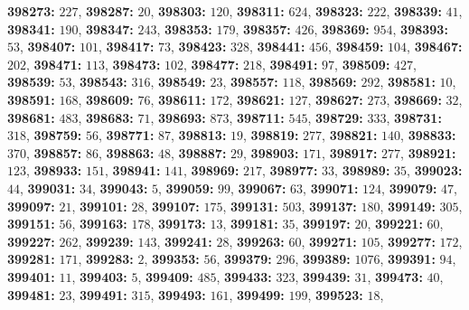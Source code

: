 \textsf{\bfseries 398273:} $227$, \textsf{\bfseries 398287:} $20$, \textsf{\bfseries 398303:} $120$, \textsf{\bfseries 398311:} $624$, \textsf{\bfseries 398323:} $222$, \textsf{\bfseries 398339:} $41$, \textsf{\bfseries 398341:} $190$, \textsf{\bfseries 398347:} $243$, \textsf{\bfseries 398353:} $179$, \textsf{\bfseries 398357:} $426$, \textsf{\bfseries 398369:} $954$, \textsf{\bfseries 398393:} $53$, \textsf{\bfseries 398407:} $101$, \textsf{\bfseries 398417:} $73$, \textsf{\bfseries 398423:} $328$, \textsf{\bfseries 398441:} $456$, \textsf{\bfseries 398459:} $104$, \textsf{\bfseries 398467:} $202$, \textsf{\bfseries 398471:} $113$, \textsf{\bfseries 398473:} $102$, \textsf{\bfseries 398477:} $218$, \textsf{\bfseries 398491:} $97$, \textsf{\bfseries 398509:} $427$, \textsf{\bfseries 398539:} $53$, \textsf{\bfseries 398543:} $316$, \textsf{\bfseries 398549:} $23$, \textsf{\bfseries 398557:} $118$, \textsf{\bfseries 398569:} $292$, \textsf{\bfseries 398581:} $10$, \textsf{\bfseries 398591:} $168$, \textsf{\bfseries 398609:} $76$, \textsf{\bfseries 398611:} $172$, \textsf{\bfseries 398621:} $127$, \textsf{\bfseries 398627:} $273$, \textsf{\bfseries 398669:} $32$, \textsf{\bfseries 398681:} $483$, \textsf{\bfseries 398683:} $71$, \textsf{\bfseries 398693:} $873$, \textsf{\bfseries 398711:} $545$, \textsf{\bfseries 398729:} $333$, \textsf{\bfseries 398731:} $318$, \textsf{\bfseries 398759:} $56$, \textsf{\bfseries 398771:} $87$, \textsf{\bfseries 398813:} $19$, \textsf{\bfseries 398819:} $277$, \textsf{\bfseries 398821:} $140$, \textsf{\bfseries 398833:} $370$, \textsf{\bfseries 398857:} $86$, \textsf{\bfseries 398863:} $48$, \textsf{\bfseries 398887:} $29$, \textsf{\bfseries 398903:} $171$, \textsf{\bfseries 398917:} $277$, \textsf{\bfseries 398921:} $123$, \textsf{\bfseries 398933:} $151$, \textsf{\bfseries 398941:} $141$, \textsf{\bfseries 398969:} $217$, \textsf{\bfseries 398977:} $33$, \textsf{\bfseries 398989:} $35$, \textsf{\bfseries 399023:} $44$, \textsf{\bfseries 399031:} $34$, \textsf{\bfseries 399043:} $5$, \textsf{\bfseries 399059:} $99$, \textsf{\bfseries 399067:} $63$, \textsf{\bfseries 399071:} $124$, \textsf{\bfseries 399079:} $47$, \textsf{\bfseries 399097:} $21$, \textsf{\bfseries 399101:} $28$, \textsf{\bfseries 399107:} $175$, \textsf{\bfseries 399131:} $503$, \textsf{\bfseries 399137:} $180$, \textsf{\bfseries 399149:} $305$, \textsf{\bfseries 399151:} $56$, \textsf{\bfseries 399163:} $178$, \textsf{\bfseries 399173:} $13$, \textsf{\bfseries 399181:} $35$, \textsf{\bfseries 399197:} $20$, \textsf{\bfseries 399221:} $60$, \textsf{\bfseries 399227:} $262$, \textsf{\bfseries 399239:} $143$, \textsf{\bfseries 399241:} $28$, \textsf{\bfseries 399263:} $60$, \textsf{\bfseries 399271:} $105$, \textsf{\bfseries 399277:} $172$, \textsf{\bfseries 399281:} $171$, \textsf{\bfseries 399283:} $2$, \textsf{\bfseries 399353:} $56$, \textsf{\bfseries 399379:} $296$, \textsf{\bfseries 399389:} $1076$, \textsf{\bfseries 399391:} $94$, \textsf{\bfseries 399401:} $11$, \textsf{\bfseries 399403:} $5$, \textsf{\bfseries 399409:} $485$, \textsf{\bfseries 399433:} $323$, \textsf{\bfseries 399439:} $31$, \textsf{\bfseries 399473:} $40$, \textsf{\bfseries 399481:} $23$, \textsf{\bfseries 399491:} $315$, \textsf{\bfseries 399493:} $161$, \textsf{\bfseries 399499:} $199$, \textsf{\bfseries 399523:} $18$, 
